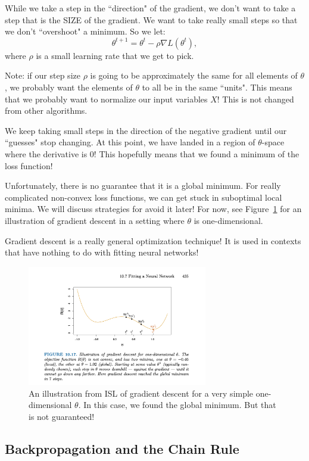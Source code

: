While we take a step in the ``direction" of the gradient, we don't want to take a step that is the SIZE of the gradient. We want to take really small steps so that we don't ``overshoot" a minimum. So we let: 
$$
\theta^{t+1} = \theta^t - \rho \nabla L(\theta^{t}),
$$
where $\rho$ is a small learning rate that we get to pick.

Note: if our step size $\rho$ is going to be approximately the same for all elements of $\theta$, we probably want the elements of $\theta$ to all be in the same ``units". This means that we probably want to normalize our input variables $X$! This is not changed from other algorithms. 

We keep taking small steps in the direction of the negative gradient until our ``guesses" stop changing. At this point, we have landed in a region of $\theta$-space where the derivative is 0! This hopefully means that we found a minimum of the loss function!

Unfortunately, there is no guarantee that it is a global minimum. For really complicated non-convex loss functions, we can get stuck in suboptimal local minima. We will discuss strategies for avoid it later! For now, see Figure~\ref{fig_gd} for an illustration of gradient descent in a setting where $\theta$ is one-dimensional. 

Gradient descent is a really general optimization technique! It is used in contexts that have nothing to do with fitting neural networks!

\begin{figure}[h]
\centering 
\includegraphics[width=0.7\textwidth]{442_lecs/gradient.png}
\caption{An illustration from ISL of gradient descent for a very simple one-dimensional $\theta$. In this case, we found the global minimum. But that is not guaranteed!}
\label{fig_gd}
\end{figure}

\subsection{Backpropagation and the Chain Rule}

